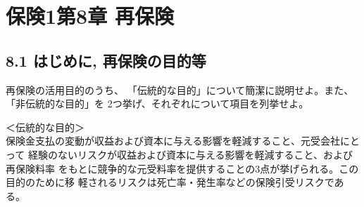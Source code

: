 \documentclass[report,gutter=10mm,fore-edge=10mm,uplatex,dvipdfmx]{jlreq}
\begin{document}
\chapter{保険1第8章 再保険}
\section{8.1 はじめに, 再保険の目的等  }

再保険の活用目的のうち、
「伝統的な目的」について簡潔に説明せよ。また、
「非伝統的な目的」を 2つ挙げ、それぞれについて項目を列挙せよ。
\answer{}

\noindent ＜伝統的な目的＞\\
保険金支払の変動が収益および資本に与える影響を軽減すること、元受会社にとって
経験のないリスクが収益および資本に与える影響を軽減すること、および再保険料率
をもとに競争的な元受料率を提供することの3点が挙げられる。この目的のために移
軽されるリスクは死亡率・発生率などの保険引受リスクである。
\end{document}
